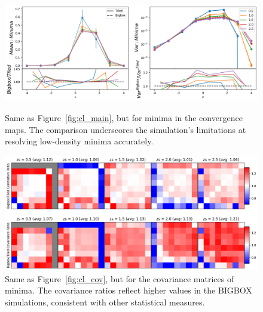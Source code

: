 \begin{figure}[p]
    \centering
    \includegraphics[width=\textwidth]{figures/results/minima_main.png}
    \caption{Same as Figure~\ref{fig:cl_main}, but for minima in the convergence maps. The comparison underscores the simulation's limitations at resolving low-density minima accurately.}
    \label{fig:min_main}
    \vspace{2cm}
    \includegraphics[width=\textwidth]{figures/results/minima_cov.png}
    \caption{Same as Figure~\ref{fig:cl_cov}, but for the covariance matrices of minima. The covariance ratios reflect higher values in the BIGBOX simulations, consistent with other statistical measures.}
    \label{fig:min_cov}
\end{figure}

